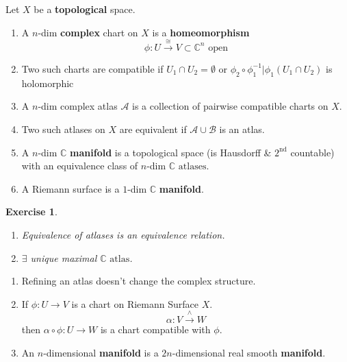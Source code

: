 \documentclass{article}
\newtheorem{exercise}{Exercise}
\begin{document}
\begin{definition}
    Let $X$ be a \textbf{topological} space.
    \begin{enumerate}
        \item A $n$-dim \textbf{complex} chart on $X$ is a \textbf{homeomorphism}
        \[
        \phi : U \xrightarrow{\cong} V \subset \mathbb{C}^n \text{ open}
        \]
        \item Two such charts are compatible if
        $U_1 \cap U_2 = \emptyset$ or $\phi_2 \circ \phi_1^{-1} \big| \phi_1 (U_1 \cap U_2)$ is holomorphic
        \item A $n$-dim complex atlas $\mathcal{A}$ is a collection of pairwise compatible charts on $X$.
        \item Two such atlases on $X$ are equivalent if $\mathcal{A} \cup \mathcal{B}$ is an atlas.
        \item A $n$-dim $\mathbb{C}$ \textbf{manifold} is a topological space (is Hausdorff \& $2^{\text{nd}}$ countable) with an equivalence class of $n$-dim $\mathbb{C} \text{ atlases}$.
        \item A Riemann surface is a $1$-dim $\mathbb{C}$ \textbf{manifold}.
    \end{enumerate}
\end{definition}

\begin{exercise}
\begin{enumerate}
    \item Equivalence of atlases is an equivalence relation.
    \item $\exists$ unique maximal $\mathbb{C} \text{ atlas}$.
\end{enumerate}
\end{exercise}

\begin{remark}
    \begin{enumerate}[\upshape (i)]
        \item Refining an atlas doesn't change the complex structure.
        \item If $\phi : U \to V$ is a chart on Riemann Surface $X$.
        \[
        \alpha : V \xrightarrow{\wedge} W
        \]
        then $\alpha \circ \phi : U \to W$ is a chart compatible with $\phi$.
        \item An $n$-dimensional \textbf{manifold} is a $2n$-dimensional real smooth \textbf{manifold}.
    \end{enumerate}
\end{remark}
\end{document}
